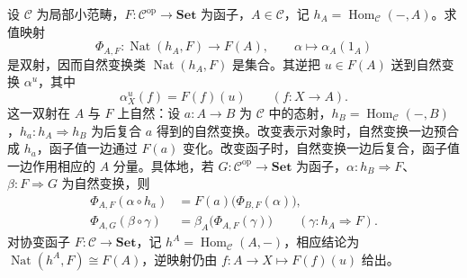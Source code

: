 \begin{theorem}[Yoneda 引理]\label{b4:thm:yoneda}
	设 \(\mathcal C\) 为局部小范畴，\(F:\mathcal C^{\mathrm{op}}\rightarrow\mathbf{Set}\) 为函子，\(A\in\mathcal C\)，记 \(h_A=\operatorname{Hom}_{\mathcal C}(-,A)\)。求值映射
	\[
		\Phi_{A,F}:\operatorname{Nat}(h_A,F)\longrightarrow F(A), \qquad \alpha\longmapsto\alpha_A(1_A)
	\]
	是双射，因而自然变换类 \(\operatorname{Nat}(h_A,F)\) 是集合。其逆把 \(u\in F(A)\) 送到自然变换 \(\alpha^u\)，其中
	\[
		\alpha^u_X(f)=F(f)(u)\qquad(f:X\rightarrow A).
	\]
	这一双射在 \(A\) 与 \(F\) 上自然：设 \(a:A\rightarrow B\) 为 \(\mathcal C\) 中的态射，\(h_B=\operatorname{Hom}_{\mathcal C}(-,B)\)，\(h_a:h_A\Rightarrow h_B\) 为后复合 \(a\) 得到的自然变换。改变表示对象时，自然变换一边预合成 \(h_a\)，函子值一边通过 \(F(a)\) 变化。改变函子时，自然变换一边后复合，函子值一边作用相应的 \(A\) 分量。具体地，若 \(G:\mathcal C^{\mathrm{op}}\rightarrow\mathbf{Set}\) 为函子，\(\alpha:h_B\Rightarrow F\)、\(\beta:F\Rightarrow G\) 为自然变换，则
	\[
		\begin{aligned}
			\Phi_{A,F}(\alpha\circ h_a)&=F(a)\bigl(\Phi_{B,F}(\alpha)\bigr),\\
			\Phi_{A,G}(\beta\circ\gamma)&=\beta_A\bigl(\Phi_{A,F}(\gamma)\bigr) \qquad(\gamma:h_A\Rightarrow F).
		\end{aligned}
	\]
	对协变函子 \(F:\mathcal C\rightarrow\mathbf{Set}\)，记 \(h^A=\operatorname{Hom}_{\mathcal C}(A,-)\)，相应结论为 \(\operatorname{Nat}(h^A,F)\cong F(A)\)，逆映射仍由 \(f:A\rightarrow X\mapsto F(f)(u)\) 给出。
\end{theorem}
